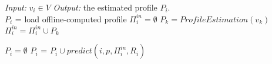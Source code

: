 \begin{algorithm}[t]
\begin{algorithmic}
  \State\textit{Input:} $v_i \in V$
  \State\textit{Output:} the estimated profile $P_{i}$.\\

  
        	\State $P_{i}$ = load offline-computed profile
    \Else
           \State   $\Pi^{in}_i  = \emptyset$
           	    \State $P_{k} = ProfileEstimation(v_k)$
           	    \State  $\Pi^{in}_i   = \Pi^{in}_i  \cup P_{k}$
           	\EndFor
           	
           	\State $P_{i} = \emptyset$
           	    \State $P_{i}$ = $P_{i} \cup  predict(i, p, \Pi^{in}_i, R_i)$
            \EndFor
    \EndIf
\EndProcedure
\end{algorithmic}
\end{algorithm}